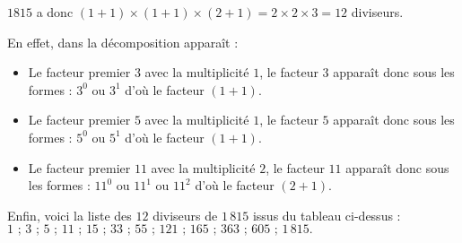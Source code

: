 \begin{corrige}
\begin{enumerate}
        $\num{1815}$ a donc $(1+1)\times(1+1)\times(2+1) = 2\times2\times3 = 12$ diviseurs.

        En effet, dans la décomposition apparaît : 
        \begin{itemize}
            \item Le facteur premier $3$ avec la multiplicité $1$, le facteur $3$ apparaît donc sous les formes : $3^{0}$ ou $3^{1}$ d'où le facteur $(1+1)$.
            \item Le facteur premier $5$ avec la multiplicité $1$, le facteur $5$ apparaît donc sous les formes : $5^{0}$ ou $5^{1}$ d'où le facteur $(1+1)$.
            \item Le facteur premier $11$ avec la multiplicité $2$, le facteur $11$ apparaît donc sous les formes : $11^{0}$ ou $11^{1}$ ou $11^{2}$ d'où le facteur $(2+1)$.
        \end{itemize}
        
        Enfin, voici la liste des $12$ diviseurs de $1\,815$ issus du tableau ci-dessus : $1\text{ ; }3\text{ ; }5\text{ ; }11\text{ ; }15\text{ ; }33\text{ ; }55\text{ ; }121\text{ ; }165\text{ ; }363\text{ ; }605\text{ ; }1\,815.$
    \end{enumerate}
    
\end{corrige}

